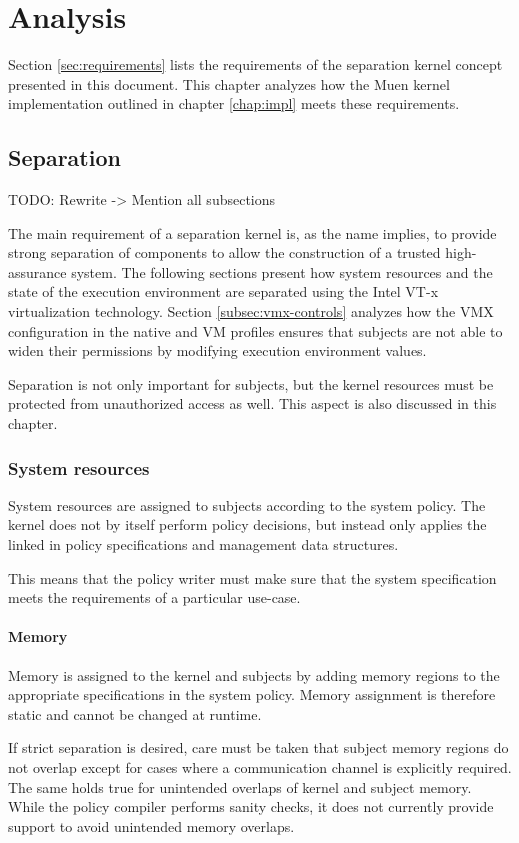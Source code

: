 \chapter{Analysis}
Section \ref{sec:requirements} lists the requirements of the separation kernel
concept presented in this document. This chapter analyzes how the Muen kernel
implementation outlined in chapter \ref{chap:impl} meets these requirements.

\section{Separation}
TODO: Rewrite -> Mention all subsections

The main requirement of a separation kernel is, as the name implies, to provide
strong separation of components to allow the construction of a trusted
high-assurance system. The following sections present how system resources and
the state of the execution environment are separated using the Intel VT-x
virtualization technology. Section \ref{subsec:vmx-controls} analyzes how the
VMX configuration in the native and VM profiles ensures that subjects are not
able to widen their permissions by modifying execution environment values.

Separation is not only important for subjects, but the kernel resources must be
protected from unauthorized access as well. This aspect is also discussed in
this chapter.

\subsection{System resources}
System resources are assigned to subjects according to the system policy. The
kernel does not by itself perform policy decisions, but instead only applies
the linked in policy specifications and management data structures.

This means that the policy writer must make sure that the system specification
meets the requirements of a particular use-case.

\subsubsection{Memory}
Memory is assigned to the kernel and subjects by adding memory regions to the
appropriate specifications in the system policy. Memory assignment is therefore
static and cannot be changed at runtime.

If strict separation is desired, care must be taken that subject memory regions
do not overlap except for cases where a communication channel is explicitly
required. The same holds true for unintended overlaps of kernel and subject
memory.  While the policy compiler performs sanity checks, it does not currently
provide support to avoid unintended memory overlaps.


